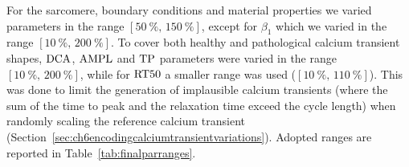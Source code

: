 \vspace{0.2cm}
For the sarcomere, boundary conditions and material properties we varied parameters in the range $[\SI{50}{\percent},\,\SI{150}{\percent}]$, except for $\beta_1$ which we varied in the range $[\SI{10}{\percent},\,\SI{200}{\percent}]$. To cover both healthy and pathological calcium transient shapes, $\textrm{DCA}$, $\textrm{AMPL}$ and $\textrm{TP}$ parameters were varied in the range $[\SI{10}{\percent},\,\SI{200}{\percent}]$, while for $\textrm{RT50}$ a smaller range was used ($[\SI{10}{\percent},\,\SI{110}{\percent}]$). This was done to limit the generation of implausible calcium transients (where the sum of the time to peak and the relaxation time exceed the cycle length) when randomly scaling the reference calcium transient (Section~\ref{sec:ch6encodingcalciumtransientvariations}). Adopted ranges are reported in Table~\ref{tab:finalparranges}.

